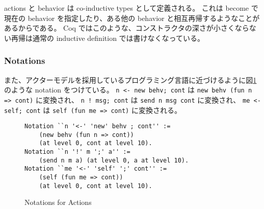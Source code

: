 actions と behavior は co-inductive types として定義される。
これは become で現在の behavior を指定したり、ある他の behavior と相互再帰するようなことがあるからである。
Coq ではこのような、コンストラクタの深さが小さくならない再帰は通常の inductive definition では書けなくなっている。

\subsubsection{Notations}

また、アクターモデルを採用しているプログラミング言語に近づけるように図\ref{coq:notation}のような notation をつけている。
\lstinline|n <- new behv; cont| は \lstinline|new behv (fun n => cont)| に変換され、
\lstinline|n ! msg; cont| は \lstinline|send n msg cont| に変換され、
\lstinline|me <- self; cont| は \lstinline|self (fun me => cont)| に変換される。

\begin{figure}[tb]
\begin{lstlisting}
Notation ``n '<-' 'new' behv ; cont'' :=
    (new behv (fun n => cont))
    (at level 0, cont at level 10).
Notation ``n '!' m ';' a'' :=
    (send n m a) (at level 0, a at level 10).
Notation ``me '<-' 'self' ';' cont'' :=
    (self (fun me => cont))
    (at level 0, cont at level 10).
\end{lstlisting}
\caption{Notations for Actions}\label{coq:notation}
\end{figure}
